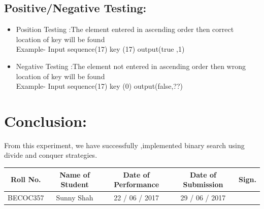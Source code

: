 \documentclass{article}
\begin{document}
	\subsection{Positive/Negative Testing:}
	\begin{itemize}
		\item Position Testing :The element entered in ascending order then correct location of key will be found\\
		Example- Input sequence(17) key (17) output(true ,1)\\
		\item Negative Testing :The element not entered in ascending order then wrong location of key will be found\\
		Example- Input sequence(17) key (0) output(false,??)\\
	\end{itemize}
	
	\section{Conclusion:}
	From this experiment, we have successfully ,implemented binary search
	using divide and conquer strategies.
	
	\begin{center}
		\begin{tabular}
			{|c|c|c|c|c|}\hline
			{\bf Roll No.}		&{\bf Name of Student}	&{\bf Date of Performance}  				&{\bf Date of Submission}	&{\bf Sign.}  \\    \hline
			BECOC357	& Sunny Shah &  22 / 06 / 2017		& 29 / 06 / 2017		&  \\ \hline
		\end{tabular}\\ 
	\end{center}
	
\end{document}

